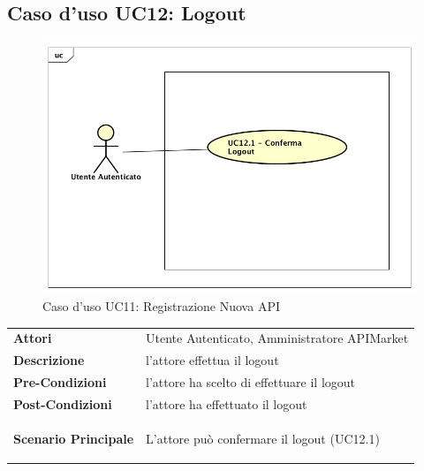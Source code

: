 \newpage
\subsection{Caso d'uso UC12: Logout}
\label{UC12}
\begin{figure}[ht]
	\centering
	\includegraphics[scale=0.45]{UML/UC12.png}
	\caption{Caso d'uso UC11: Registrazione Nuova API}
\end{figure}

\renewcommand*{\arraystretch}{1.6}
\begin{longtable}{ l | p{11cm}}
	\hline
	\rowcolor{Gray}
	\multicolumn{2}{c}{UC12: Logout} \\
	\hline
	\textbf{Attori} &Utente Autenticato, Amministratore APIMarket \\
	\textbf{Descrizione} &l'attore effettua il logout \\
	\textbf{Pre-Condizioni} &  l'attore ha scelto di effettuare il logout\\
	\textbf{Post-Condizioni}&l'attore ha effettuato il logout\\
	\textbf{Scenario Principale} & \begin{enumerate*}[label=(\arabic*.),itemjoin={\newline}]
			\item L'attore può confermare il logout (UC12.1)
	\end{enumerate*}\\
\end{longtable}

